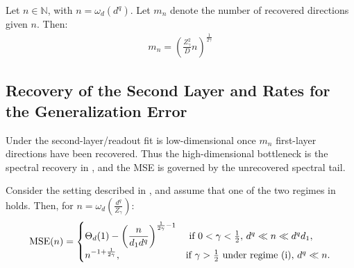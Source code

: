 \documentclass[]{article}
\numberwithin{equation}{section}
\theoremstyle{definition}
\newcommand{\NN}{\mathbb{N}}
\begin{document}
\begin{corollary} Let $n  \in \NN$, with $ n = \omega_{d}(d^{q})$. Let $m_{n}$ denote the number of recovered directions given $n$. Then: 
\begin{align}
m_{n} = \left ( \frac{Z^2_\gamma}{D} n\right )^{\frac{1}{2\gamma}}
\end{align}
\label{cor:number_of_directions}
\end{corollary}

\subsection{Recovery of the Second Layer and Rates for the Generalization Error}
\label{subsection:generalization}
Under  the second-layer/readout fit is low-dimensional once $m_n$ first-layer directions have been recovered. Thus the high-dimensional bottleneck is the spectral recovery in , and the MSE is governed by the unrecovered spectral tail.

\begin{theorem}
Consider the setting described in , and assume that one of the two regimes in  holds. Then, for $n = \omega_{d}(\frac{d^{q}}{Z_\gamma})$: 
\begin{equation}
    \mathrm{MSE}(n) = \begin{cases}
       \Theta_{d}(1) - \left (\dfrac{n}{d_1 d^{q}} \right )^{\frac{1}{2\gamma} -1}& \text{ if } 0 < \gamma < \frac{1}{2},\, d^{q}\ll n \ll d^{q}d_1, \\ 
      n^{-1 + \frac{1}{2\gamma}}, & \text{if } \gamma > \frac{1}{2} \text{ under regime \textnormal{(i)}}, \, d^{q}\ll n. 
    \end{cases}
\end{equation}
\label{thm:rates}
\end{theorem}
\end{document}

